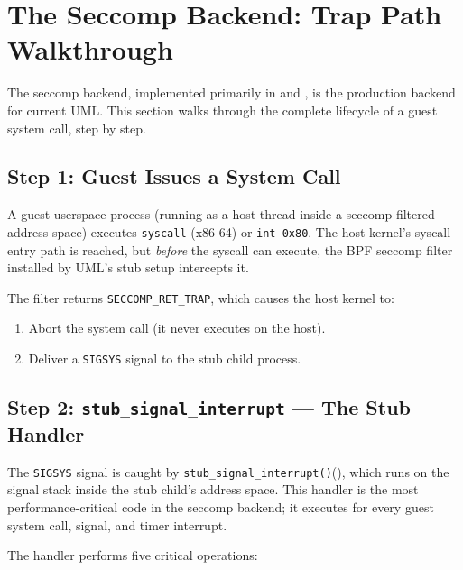 \section{The Seccomp Backend: Trap Path Walkthrough}
\label{sec:impl-seccomp-trap}

The seccomp backend, implemented primarily in
 and
, is the production backend
for current UML.  This section walks through the complete lifecycle of a
guest system call, step by step.

\subsection{Step 1: Guest Issues a System Call}

A guest userspace process (running as a host thread inside a seccomp-filtered
address space) executes \texttt{syscall} (x86-64) or \texttt{int 0x80}.  The
host kernel's syscall entry path is reached, but \emph{before} the syscall
can execute, the BPF seccomp filter installed by UML's stub setup intercepts
it.

The filter returns \texttt{SECCOMP\_RET\_TRAP}, which causes the host kernel
to:
\begin{enumerate}[nosep]
  \item Abort the system call (it never executes on the host).
  \item Deliver a \texttt{SIGSYS} signal to the stub child process.
\end{enumerate}

\subsection{Step 2: \texttt{stub\_signal\_interrupt} --- The Stub Handler}
\label{sec:impl-stub-signal-interrupt}

The \texttt{SIGSYS} signal is caught by
\texttt{stub\_signal\_interrupt()}\linebreak (),
which runs on the signal stack inside the stub child's address space.
This handler is the most performance-critical code in the seccomp backend;
it executes for every guest system call, signal, and timer interrupt.

The handler performs five critical operations:

